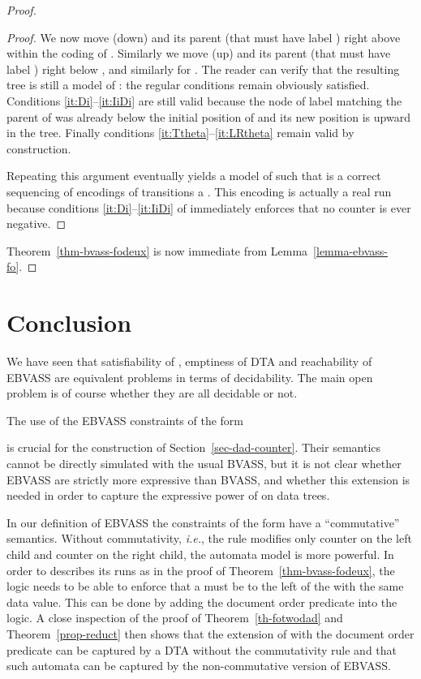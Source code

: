 \documentclass{CSML}
\newcommand\ebvass{\textup{EBVASS}\xspace}
\newcommand\dad{\textup{DTA}\xspace}
\begin{document}
\begin{proof}
\begin{proof}
We now move (down)  and its parent 
(that must have label ) 
right above  within the coding of .
Similarly we move (up)  and its parent
(that must have label ) 
right below , and similarly for .  
The reader can verify that the
resulting tree is still a model of : the regular conditions remain 
obviously satisfied.  
Conditions \ref{it:Di}--\ref{it:IiDi}  are still valid because the node of label  
matching the parent of  was already below the initial position of
 and its new position is upward in the tree. 
Finally conditions \ref{it:Ttheta}--\ref{it:LRtheta} remain valid by construction.

Repeating this argument eventually yields a model 
of  such that  is a correct sequencing of encodings of
transitions a . 
This encoding is actually a real run because 
conditions \ref{it:Di}--\ref{it:IiDi} of  immediately enforces that no counter is ever negative.\end{proof}
Theorem~\ref{thm-bvass-fodeux} is now immediate from Lemma~\ref{lemma-ebvass-fo}.
\end{proof}

\section{Conclusion}\label{sec-conclusion}We have seen that satisfiability of \fotwo, emptiness of \dad and reachability
of \ebvass are equivalent problems in terms of decidability. The main open
problem is of course whether they are all decidable or not.


The use of the \ebvass constraints of the form 

is crucial for the construction of Section~\ref{sec-dad-counter}.
Their semantics cannot be directly simulated with the usual BVASS,
but it is not clear whether \ebvass are strictly more expressive than BVASS,
and whether this extension is needed in order 
to capture the expressive power of \fotwo on data trees. 

In our definition of \ebvass the constraints of the form 
have a ``commutative'' semantics. 
Without commutativity, \textit{i.e.}, the rule modifies
only counter  on the left child and counter  on the right child,
the automata model is more powerful. 
In order to describes its runs as in the
proof of Theorem~\ref{thm-bvass-fodeux}, the logic needs to be able to enforce
that a  must be to the left of the  with the same data value. 
This can be done by adding the document order predicate into the logic.
A close inspection of the proof of Theorem~\ref{th-fotwodad} and
Theorem~\ref{prop-reduct} then shows that the extension of \fotwo with the
document order predicate can be captured by a \dad without the commutativity
rule and that such automata can be captured by the non-commutative version of
\ebvass.
\end{document}
